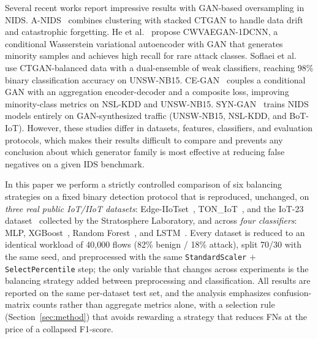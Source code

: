 ﻿\documentclass[journal]{IEEEtran}
\begin{document}
Several recent works report impressive results with GAN-based oversampling in NIDS. A-NIDS~\cite{zha2025anids} combines clustering with stacked CTGAN to handle data drift and catastrophic forgetting. He et al.~\cite{he2023cwvaegan} propose CWVAEGAN-1DCNN, a conditional Wasserstein variational autoencoder with GAN that generates minority samples and achieves high recall for rare attack classes. Soflaei et al.~\cite{soflaei2024dualctgan} use CTGAN-balanced data with a dual-ensemble of weak classifiers, reaching 98\% binary classification accuracy on UNSW-NB15. CE-GAN~\cite{yang2025cegan} couples a conditional GAN with an aggregation encoder-decoder and a composite loss, improving minority-class metrics on NSL-KDD and UNSW-NB15. SYN-GAN~\cite{rahman2024syngan} trains NIDS models entirely on GAN-synthesized traffic (UNSW-NB15, NSL-KDD, and BoT-IoT). However, these studies differ in datasets, features, classifiers, and evaluation protocols, which makes their results difficult to compare and prevents any conclusion about which generator family is most effective at reducing false negatives on a given IDS benchmark.

In this paper we perform a strictly controlled comparison of six balancing strategies on a fixed binary detection protocol that is reproduced, unchanged, on \emph{three real public IoT/IIoT datasets}: Edge-IIoTset~\cite{ferrag2022edgeiiotset}, TON\_IoT~\cite{alsaedi2020toniot}, and the IoT-23 dataset~\cite{garcia2020iot23} collected by the Stratosphere Laboratory, and across \emph{four classifiers}: MLP, XGBoost~\cite{chen2016xgboost}, Random Forest~\cite{breiman2001rf}, and LSTM~\cite{hochreiter1997lstm}. Every dataset is reduced to an identical workload of 40{,}000 flows (82\% benign / 18\% attack), split 70/30 with the same seed, and preprocessed with the same \texttt{StandardScaler} $+$ \texttt{SelectPercentile} step; the only variable that changes across experiments is the balancing strategy added between preprocessing and classification. All results are reported on the same per-dataset test set, and the analysis emphasizes confusion-matrix counts rather than aggregate metrics alone, with a selection rule (Section~\ref{sec:method}) that avoids rewarding a strategy that reduces FNs at the price of a collapsed F1-score.
\end{document}
